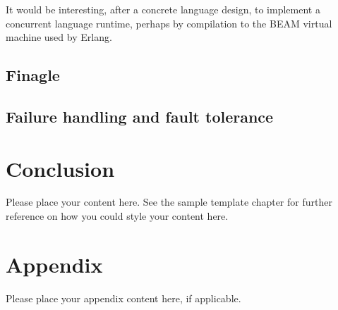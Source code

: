 \documentclass[
graybox,
envcountchap
]{svmult}
\begin{document}
\begin{bibunit}
  It would be interesting, after a concrete language design, to implement a
  concurrent language runtime, perhaps by compilation to the BEAM virtual
  machine used by Erlang.


  \subsection{Finagle}
  \subsection{Failure handling and fault tolerance}

  \section{Conclusion}

	Please place your content here. See the sample template chapter for further reference on how you could style your content here.


	\section*{Appendix}\label{appendix}

	Please place your appendix content here, if applicable.




	\putbib[bibliography] %

\end{bibunit}

\end{document}
